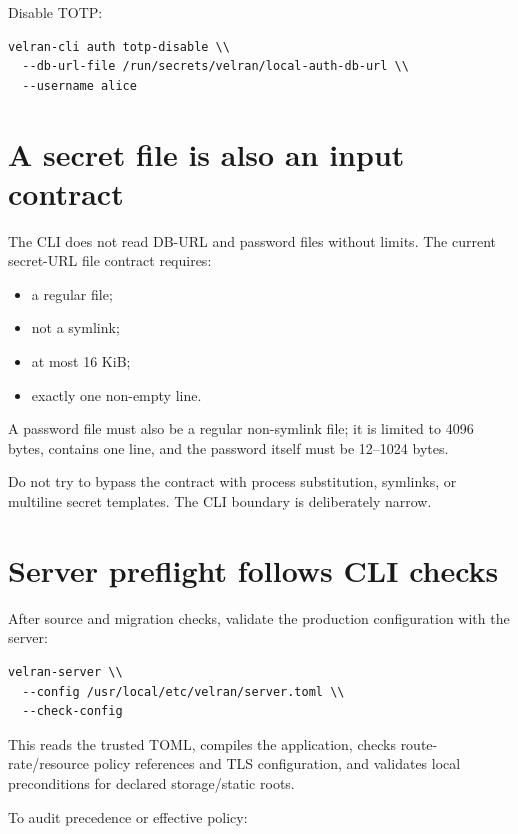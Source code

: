 Disable TOTP:

\begin{lstlisting}
velran-cli auth totp-disable \\
  --db-url-file /run/secrets/velran/local-auth-db-url \\
  --username alice
\end{lstlisting}

\section{A secret file is also an input contract}

The CLI does not read DB-URL and password files without limits. The current secret-URL file contract requires:

\begin{itemize}
  \item a regular file;
  \item not a symlink;
  \item at most 16 KiB;
  \item exactly one non-empty line.
\end{itemize}

A password file must also be a regular non-symlink file; it is limited to 4096 bytes, contains one line, and the password itself must be 12--1024 bytes.

Do not try to bypass the contract with process substitution, symlinks, or multiline secret templates. The CLI boundary is deliberately narrow.

\section{Server preflight follows CLI checks}

After source and migration checks, validate the production configuration with the server:

\begin{lstlisting}
velran-server \\
  --config /usr/local/etc/velran/server.toml \\
  --check-config
\end{lstlisting}

This reads the trusted TOML, compiles the application, checks route-rate/resource policy references and TLS configuration, and validates local preconditions for declared storage/static roots.

To audit precedence or effective policy:

